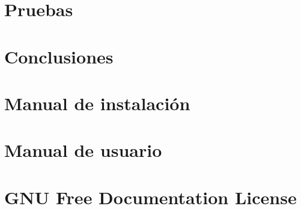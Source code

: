 \documentclass[a4paper, 12pt]{book}
\begin{document}
\chapter{Pruebas}
\label{chap:pruebas}


\chapter{Conclusiones}
\label{chap:conclusiones}


\appendix

\chapter{Manual de instalación}
\label{chap:manual_instalacion}


\chapter{Manual de usuario}
\label{chap:manual_usuario}


\chapter{GNU Free Documentation License}
\label{sec:fdl}


 

\end{document}

